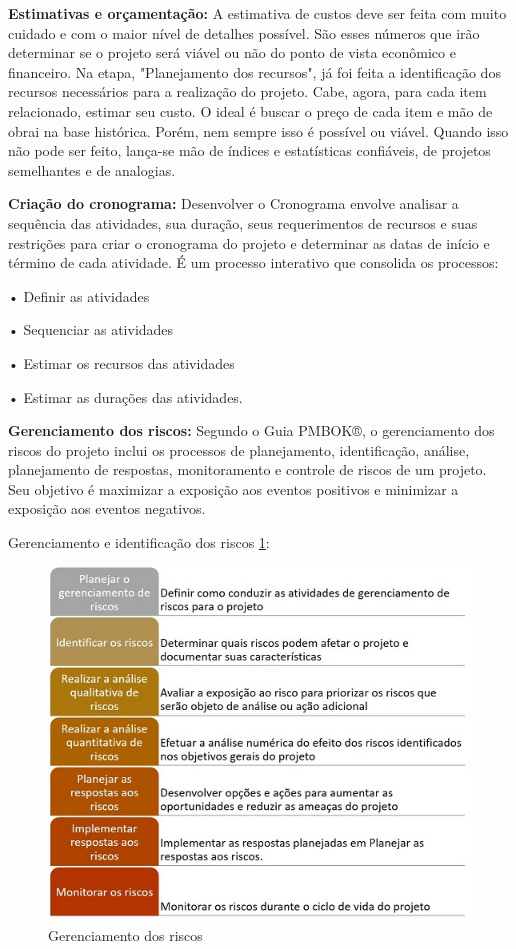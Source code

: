 \documentclass[	DIV=calc,%
							paper=a4,%
							fontsize=12pt,%
							onecolumn]{scrartcl}	 					%
\begin{document}
{\textbf{Estimativas e orçamentação:}} A estimativa de custos deve ser feita com muito cuidado e com o maior nível de detalhes possível. São esses números que irão determinar se o projeto será viável ou não do ponto de vista econômico e financeiro. Na etapa, "Planejamento dos recursos", já foi feita a identificação dos recursos necessários para a realização do projeto. Cabe, agora, para cada item relacionado, estimar seu custo. O ideal é buscar o preço de cada item e mão de obrai na base histórica. Porém, nem sempre isso é possível ou viável. Quando isso não pode ser feito, lança-se mão de índices e estatísticas confiáveis, de projetos semelhantes e de analogias.

{\textbf{Criação do cronograma:}} Desenvolver o Cronograma envolve analisar a sequência das atividades, sua duração, seus requerimentos de recursos e suas restrições para criar o cronograma do projeto e determinar as datas de início e término de cada atividade. É um processo interativo que consolida os processos:

•	Definir as atividades

•	Sequenciar as atividades

•	Estimar os recursos das atividades

•	Estimar as durações das atividades.

{\textbf{Gerenciamento dos riscos: }}Segundo o Guia PMBOK®, o gerenciamento dos riscos do projeto inclui os processos de planejamento, identificação, análise, planejamento de respostas, monitoramento e controle de riscos de um projeto. Seu objetivo é maximizar a exposição aos eventos positivos e minimizar a exposição aos eventos negativos.


Gerenciamento e identificação dos riscos \ref{rup5}: 
 \begin{figure}[h!]
    \centering
	\includegraphics[scale=1.5]{gerenciamento-dos-riscos.jpg}
	\caption{Gerenciamento dos riscos}
	\label{rup5}
\end{figure}
\end{document}
